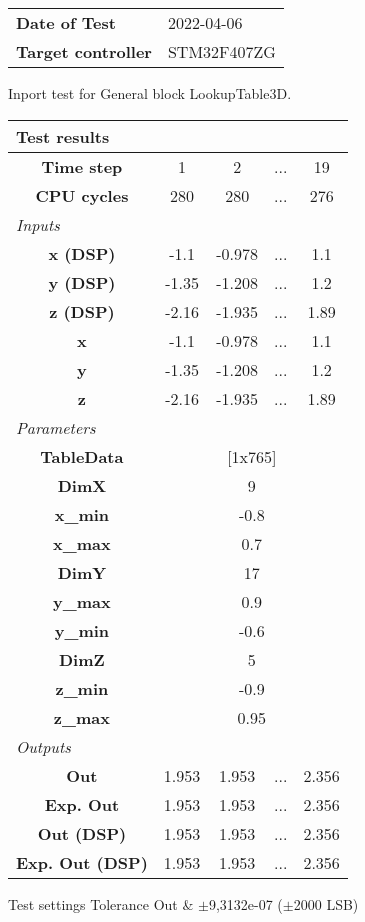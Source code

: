 \begin{tabular}{l l}
\textbf{Date of Test} & 2022-04-06 \tabularnewline
\textbf{Target controller} & STM32F407ZG \tabularnewline
\end{tabular}
\vspace{1ex}
Inport test for General block LookupTable3D.

\vspace{1em}
\begin{tabularx}{\textwidth}{|c|c|c|>{\centering\arraybackslash}X|c|}
\hline
\multicolumn{5}{|l|}{\cellcolor[gray]{0.8}\textbf{Test results}} \tabularnewline \hline
\textbf{Time step} & 1 & 2 & ... & 19 \tabularnewline \hline
\textbf{CPU cycles} & 280 & 280 & ... & 276 \tabularnewline \hline
\multicolumn{5}{|l|}{\cellcolor[gray]{0.9}\textit{Inputs}} \tabularnewline \hline
\textbf{x (DSP)} & -1.1 & -0.978 & ... & 1.1 \tabularnewline \hline
\textbf{y (DSP)} & -1.35 & -1.208 & ... & 1.2 \tabularnewline \hline
\textbf{z (DSP)} & -2.16 & -1.935 & ... & 1.89 \tabularnewline \hline
\textbf{x} & -1.1 & -0.978 & ... & 1.1 \tabularnewline \hline
\textbf{y} & -1.35 & -1.208 & ... & 1.2 \tabularnewline \hline
\textbf{z} & -2.16 & -1.935 & ... & 1.89 \tabularnewline \hline
\multicolumn{5}{|l|}{\cellcolor[gray]{0.9}\textit{Parameters}} \tabularnewline \hline
\textbf{TableData} & \multicolumn{4}{c|}{[1x765]} \tabularnewline \hline
\textbf{DimX} & \multicolumn{4}{c|}{9} \tabularnewline \hline
\textbf{x\_min} & \multicolumn{4}{c|}{-0.8} \tabularnewline \hline
\textbf{x\_max} & \multicolumn{4}{c|}{0.7} \tabularnewline \hline
\textbf{DimY} & \multicolumn{4}{c|}{17} \tabularnewline \hline
\textbf{y\_max} & \multicolumn{4}{c|}{0.9} \tabularnewline \hline
\textbf{y\_min} & \multicolumn{4}{c|}{-0.6} \tabularnewline \hline
\textbf{DimZ} & \multicolumn{4}{c|}{5} \tabularnewline \hline
\textbf{z\_min} & \multicolumn{4}{c|}{-0.9} \tabularnewline \hline
\textbf{z\_max} & \multicolumn{4}{c|}{0.95} \tabularnewline \hline
\multicolumn{5}{|l|}{\cellcolor[gray]{0.9}\textit{Outputs}} \tabularnewline \hline
\textbf{Out} & 1.953 & 1.953 & ... & 2.356 \tabularnewline \hline
\textbf{Exp. Out} & 1.953 & 1.953 & ... & 2.356 \tabularnewline \hline
\textbf{Out (DSP)} & 1.953 & 1.953 & ... & 2.356 \tabularnewline \hline
\textbf{Exp. Out (DSP)} & 1.953 & 1.953 & ... & 2.356 \tabularnewline \hline
\end{tabularx}
\vspace{1ex}

\begin{XtoCtabular}{Test settings}
Tolerance Out & $\pm$9,3132e-07 ($\pm$2000 LSB) \tabularnewline \hline
\end{XtoCtabular}

